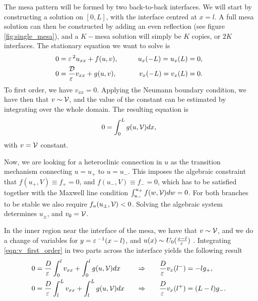 The mesa pattern will be formed by two back-to-back interfaces. We will start by constructing a solution on $[0,L]$, with the interface centred at $x=l$. A full mesa solution can then be constructed by adding an even reflection (see figure \ref{fig:single_mesa}), and a $K-$mesa solution will simply be $K$ copies, or $2K$ interfaces. 
% 
% 
The stationary equation we want to solve is
% 
\begin{equation}
\label{eqn:gms_stat}
\begin{split}
\begin{aligned}
	0 &= \varepsilon\,^2 u_{xx}+ f(u,v),\qquad &u_x(-L)=u_x(L)=0, \\
	0 &= \frac{\mathcal{D}}{\varepsilon\,}v_{xx}+ g(u,v),\qquad &v_x(-L)=v_x(L)=0.
\end{aligned}
\end{split}
\end{equation}
% 
To first order, we have $v_{xx}=0$. Applying the Neumann boundary condition, we have then that $v\sim\mathcal{V}$, and the value of the constant can be estimated by integrating over the whole domain. The resulting equation is	
% 
\begin{equation}
\label{eqn:v_first_order}
  0 = \int_0^Lg(u,\mathcal{V})dx,
\end{equation}
% 
with $v=\mathcal{V}$ constant.

Now, we are looking for a heteroclinic connection in $u$ as the transition mechanism connecting $u=u_+$ to $u=u_-$. This imposes the algebraic constraint that $f(u_+,V)\equiv f_+ = 0$, and $ f(u_-,V) \equiv f_- = 0$, which has to be satisfied together with the Maxwell line condition \cite{maxwell1994} $\int_{u_-}^{u_+} f(w,\mathcal{V})dw = 0$. For both branches to be stable we also require $f_u(u_{\pm},\mathcal{V})<0$. Solving the algebraic system determines $u_{\pm}$, and $v_0=\mathcal{V}$.

In the inner region near the interface of the mesa, we have that $v\sim\mathcal{V}$, and we do a change of variables for $y=\varepsilon\,^{-1}(x-l)$, and $u(x)\sim U_0(\frac{x-l}{\varepsilon\,})$ . Integrating \eqref{eqn:v_first_order} in two parts across the interface yields the following result
% 
\begin{equation*}
\label{eqn:w_eqn}
\begin{split}
\begin{aligned}
  0 &= \frac{D}{\varepsilon\,}\int_0^lv_{xx}+\int_0^lg(u,\mathcal{V})dx\quad&\Rightarrow&\qquad \frac{D}{\varepsilon\,}v_x(l^-)=-lg_+,\\
  0 &= \frac{D}{\varepsilon\,}\int_l^Lv_{xx}+\int_l^Lg(u,\mathcal{V})dx\quad&\Rightarrow&\qquad \frac{D}{\varepsilon\,}v_x(l^+)=(L-l)g_-.
\end{aligned}
\end{split}
\end{equation*}

